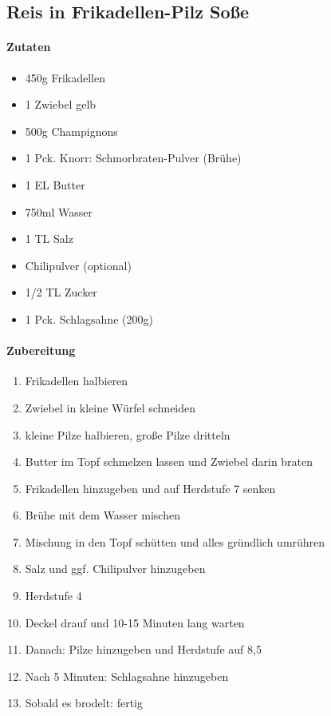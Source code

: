 \newpage
\subsection{Reis in Frikadellen-Pilz Soße}
\paragraph{Zutaten}
\begin{itemize}[noitemsep]
	\item 450g Frikadellen
	\item 1 Zwiebel gelb
	\item 500g Champignons 
	\item 1 Pck. Knorr: Schmorbraten-Pulver (Brühe)
	\item 1 EL Butter
	\item 750ml Wasser 
	\item 1 TL Salz
	\item Chilipulver (optional)
	\item 1/2 TL Zucker
	\item 1 Pck. Schlagsahne (200g)
\end{itemize}
\paragraph{Zubereitung}
\begin{enumerate}[noitemsep]
	\item Frikadellen halbieren
	\item Zwiebel in kleine Würfel schneiden
	\item kleine Pilze halbieren, große Pilze dritteln
	\item Butter im Topf schmelzen lassen und Zwiebel darin braten
	\item Frikadellen hinzugeben und auf Herdstufe 7 senken
	\item Brühe mit dem Wasser mischen
	\item Mischung in den Topf schütten und alles gründlich umrühren
	\item Salz und ggf. Chilipulver hinzugeben
	\item Herdstufe 4 
	\item Deckel drauf und 10-15 Minuten lang warten
	\item Danach: Pilze hinzugeben und Herdstufe auf 8,5
	\item Nach 5 Minuten: Schlagsahne hinzugeben
	\item Sobald es brodelt: fertig
\end{enumerate}
